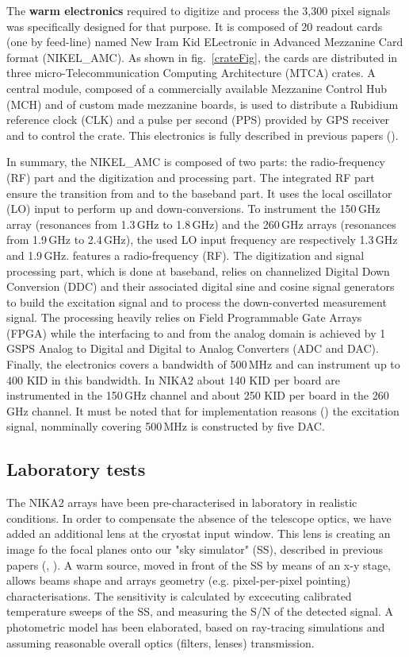 \documentclass[]{aa} %
\begin{document}
The \textbf{warm electronics} required to digitize and process the 3,300 pixel signals was specifically designed for that purpose.
It is composed of 20 readout cards (one by feed-line) named New Iram Kid ELectronic in Advanced Mezzanine Card format (NIKEL\_AMC).
As shown in fig.~\ref{crateFig}, the cards are distributed in three micro-Telecommunication Computing Architecture (MTCA) crates.
A central module, composed of a commercially available Mezzanine Control Hub (MCH) and of custom made mezzanine boards, is used to distribute a Rubidium reference clock (CLK) and a pulse per second (PPS) provided by GPS receiver and to control the crate.
This electronics is fully described in previous papers (\cite{Bourrion2012,Bourrion2016}).


In summary, the NIKEL\_AMC is composed of two parts: the radio-frequency (RF) part and the digitization and processing part.
The integrated RF part ensure the transition from and to the baseband part.
It uses the local oscillator (LO) input to perform up and down-conversions.
To instrument the 150\,GHz array (resonances from 1.3\,GHz to 1.8\,GHz) and the 260\,GHz arrays (resonances from 1.9\,GHz to 2.4\,GHz), the used LO input frequency are respectively 1.3\,GHz and 1.9\,GHz.
features a radio-frequency (RF).
The digitization and signal processing part, which is done at baseband, relies on channelized Digital Down Conversion (DDC) and their associated digital sine and cosine signal generators to build the excitation signal and to process the down-converted measurement signal.
The processing heavily relies on Field Programmable Gate Arrays (FPGA) while the interfacing to and from the analog domain is achieved by 1\,GSPS Analog to Digital and Digital to Analog Converters (ADC and DAC).
Finally, the electronics covers a bandwidth of 500\,MHz and can instrument up to 400 KID in this bandwidth. In NIKA2 about 140 KID per board are instrumented in the 150\,GHz channel and about 250 KID per board in the 260\,GHz channel.
It must be noted that for implementation reasons (\cite{Bourrion2012,Bourrion2016}) the excitation signal, nomminally covering 500\,MHz is constructed by five DAC.



\subsection{Laboratory tests}
\label{Laboratory tests}

The NIKA2 arrays have been pre-characterised in laboratory in realistic conditions. In order to compensate the absence of the telescope optics, we have added an additional lens at the cryostat input window. This lens is creating an image fo the focal planes onto our "sky simulator" (SS), described in previous papers (\cite{Catalano2014}, \cite{Monfardini2011}). A warm source, moved in front of the SS by means of an x-y stage, allows beams shape and arrays geometry (e.g. pixel-per-pixel pointing) characterisations. The sensitivity is calculated by excecuting calibrated temperature sweeps of the SS, and measuring the S/N of the detected signal. A photometric model has been elaborated, based on ray-tracing simulations and assuming reasonable overall optics (filters, lenses) transmission. 
\end{document}
